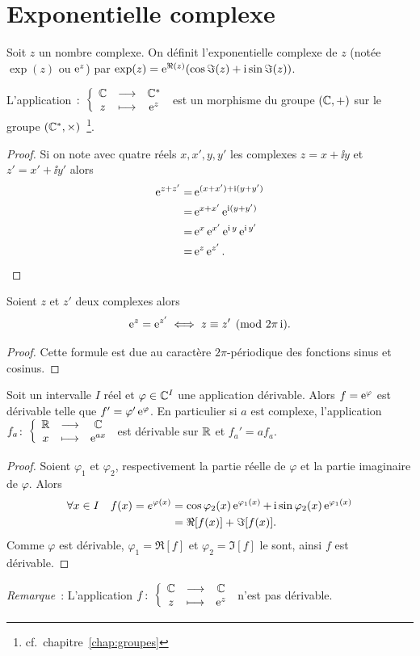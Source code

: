 \section{Exponentielle complexe}
\label{sec:expcomplexe}
\begin{defdef}
  Soit $z$ un nombre complexe. On définit l'exponentielle complexe de $z$ (notée $\exp(z)$ ou $\operatorname{e}^z$) par $\exp(z)=\operatorname{e}^{\Re(z)}(\cos \Im(z) + \operatorname{i} \sin \Im(z))$.
\end{defdef}
\begin{prop}
  L'application $\colon \left\{\begin{array}{ccc} \mathbb{C} & \longrightarrow &\mathbb{C}^*\\ z & \longmapsto & \operatorname{e}^z \end{array} \right.$ est un morphisme du groupe $(\mathbb{C},+)$ sur le groupe $(\mathbb{C}^*,\times)$~\footnote{cf.\ chapitre~\ref{chap:groupes}}.
\end{prop}
\begin{proof}
  Si on note avec quatre réels $x,x',y,y'$ les complexes $z=x+\ii y$ et $z'=x'+\ii y'$ alors
  \begin{align}
    \operatorname{e}^{z+z'} =& \operatorname{e}^{(x+x') + \operatorname{i}(y+y')}\\
    =&\operatorname{e}^{x+x'} \operatorname{e}^{\operatorname{i} (y+y')}\\
    =& \operatorname{e}^{x} \operatorname{e}^{x'} \operatorname{e}^{\operatorname{i} y} \operatorname{e}^{\operatorname{i} y'}\\
    =& \operatorname{e}^z \operatorname{e}^{z'}.
  \end{align}
\end{proof}
%
\begin{prop}
  Soient $z$ et $z'$ deux complexes alors
  \begin{equation}
    \operatorname{e}^z=\operatorname{e}^{z'} \iff z \equiv z' \pmod {2\pi \operatorname{i}}.
  \end{equation}
\end{prop}
\begin{proof}
   Cette formule est due au caractère $2\pi$-périodique des fonctions sinus et cosinus.
 \end{proof}
%
 \begin{prop}
   Soit un intervalle $I$ réel et $\varphi \in \mathbb{C}^{I}$ une application dérivable. Alors $f=\operatorname{e}^\varphi$ est dérivable telle que $f'=\varphi' \operatorname{e}^\varphi$. En particulier si $a$ est complexe, l'application $f_a\colon \left\{\begin{array}{ccc} \mathbb{R} & \longrightarrow &\mathbb{C}\\ x & \longmapsto & \operatorname{e}^{ax} \end{array} \right.$ est dérivable sur $\mathbb{R}$ et $f_a'=af_a$.
 \end{prop}
 \begin{proof}
   Soient $\varphi_1$ et $\varphi_2$, respectivement la partie réelle de $\varphi$ et la partie imaginaire de $\varphi$. Alors
   \begin{align}
     \forall x \in I \quad f(x)=e^{\varphi(x)}&=\cos \varphi_2(x) \operatorname{e}^{\varphi_1(x)}+ \operatorname{i} \sin \varphi_2(x)\operatorname{e}^{\varphi_1(x)} \\
     &= \Re[f(x)] + \Im[f(x)].
   \end{align}
  Comme $\varphi$ est dérivable, $\varphi_1=\Re[f]$ et $\varphi_2=\Im[f]$ le sont, ainsi $f$ est dérivable.
\end{proof}
\emph{Remarque}~: L'application $f\colon \left\{\begin{array}{ccc} \mathbb{C} & \longrightarrow &\mathbb{C}\\ z & \longmapsto & \operatorname{e}^z \end{array} \right.$ n'est pas dérivable.
